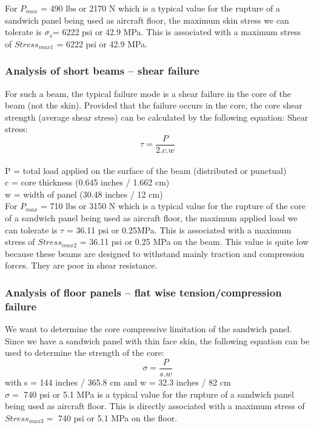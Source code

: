 For $ P_{max}$ = 490 lbs or 2170 N which is a typical value for the rupture of a sandwich panel being used as aircraft floor, the maximum skin stress we can tolerate is $ \sigma_{s}$= 6222 psi or 42.9 MPa.
This is associated with a maximum stress of $Stress_{max 1}$ = 6222 psi or 42.9 MPa.
\subsubsection{Analysis of short beams – shear failure}
For such a beam, the typical failure mode is a shear failure in the core of the beam (not the skin). Provided that the failure occurs in the core, the core shear strength (average shear stress) can be calculated by the following equation:
Shear stress: \[ \tau = \frac{P}{2.c.w} \]
\\
P = total load applied on the surface of the beam (distributed or punctual)\\
c = core thickness (0.645 inches / 1.662 cm)\\
w = width of panel (30.48 inches / 12 cm)\\

For $P_{max}$ = 710 lbs or 3150 N which is a typical value for the rupture of the core of a sandwich panel being used as aircraft floor, the maximum applied load we can tolerate is $ \tau$ = 36.11 psi or 0.25MPa.
This is associated with a maximum stress of $Stress_{max 2}$ = 36.11 psi or 0.25 MPa on the beam. This value is quite low because these beams are designed to withstand mainly traction and compression forces. They are poor in shear resistance.
\subsubsection{Analysis of floor panels – flat wise tension/compression failure}
We want to determine the core compressive limitation of the sandwich panel. Since we have a sandwich panel with thin face skin, the following equation can be used to determine the strength of the core:
\[ \sigma = \frac{P}{s.w} \]
with s = 144 inches / 365.8 cm and w = 32.3 inches / 82 cm \\
$ \sigma =$ 740 psi or 5.1 MPa is a typical value for the rupture of a sandwich panel being used as aircraft floor. This is directly associated with a maximum stress of $ Stress_{max 3} =$ 740 psi or 5.1 MPa on the floor.

